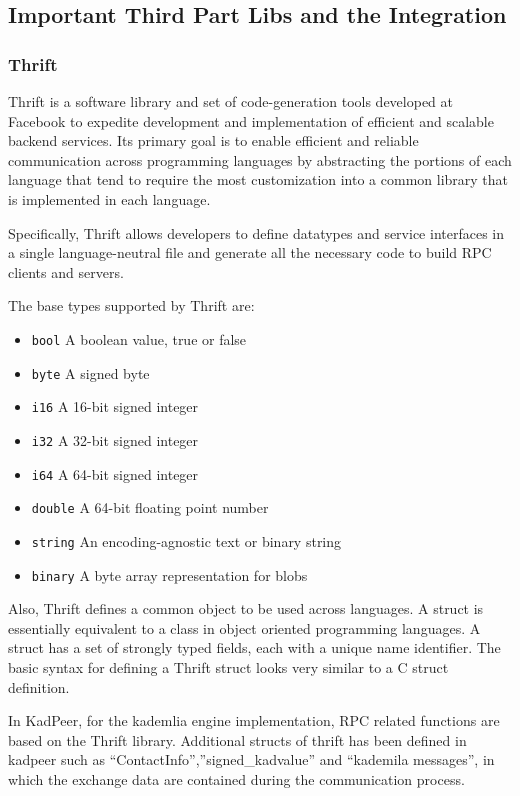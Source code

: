 \subsection{Important Third Part Libs and the Integration}
\subsubsection{Thrift}
{
Thrift is a software library and set of code-generation tools developed at Facebook to expedite development and implementation of efficient and scalable backend services. 
Its primary goal is to enable efficient and reliable communication across programming languages by abstracting the portions of each language that tend to require the most customization into a common library that is implemented in each language.

Specifically, Thrift allows developers to define datatypes and service interfaces in a single language-neutral file and generate all the necessary code to build RPC clients and servers.

The base types supported by Thrift are:
\begin{itemize}
\item \texttt{bool} A boolean value, true or false
\item \texttt{byte} A signed byte
\item \texttt{i16} A 16-bit signed integer
\item \texttt{i32} A 32-bit signed integer
\item \texttt{i64} A 64-bit signed integer
\item \texttt{double} A 64-bit floating point number
\item \texttt{string} An encoding-agnostic text or binary string
\item \texttt{binary} A byte array representation for blobs
\end{itemize}
Also, Thrift defines a common object to be used across languages. 
A struct is essentially equivalent to a class in object oriented programming languages. 
A struct has a set of strongly typed fields, each with a unique name identifier. 
The basic syntax for defining a Thrift struct looks very similar to a C struct definition. 

In KadPeer, for the kademlia engine implementation, RPC related functions are based on the Thrift library.
Additional structs of thrift has been defined in kadpeer such as ``ContactInfo'',''signed\_kadvalue'' and ``kademila messages'', in which the exchange data are contained during the communication process.

}

